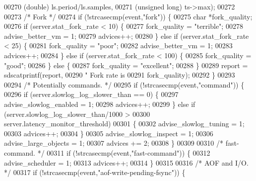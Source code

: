 \begin{DoxyCode}
{00270             (\textcolor{keywordtype}{double}) ls.period/ls.samples,
00271             (\textcolor{keywordtype}{unsigned} \textcolor{keywordtype}{long}) ts->max);
00272 
00273         \textcolor{comment}{/* Fork */}
00274         \textcolor{keywordflow}{if} (!strcasecmp(event,\textcolor{stringliteral}{"fork"})) \{
00275             \textcolor{keywordtype}{char} *fork\_quality;
00276             \textcolor{keywordflow}{if} (server.stat\_fork\_rate < 10) \{
00277                 fork\_quality = \textcolor{stringliteral}{"terrible"};
00278                 advise\_better\_vm = 1;
00279                 advices++;
00280             \} \textcolor{keywordflow}{else} \textcolor{keywordflow}{if} (server.stat\_fork\_rate < 25) \{
00281                 fork\_quality = \textcolor{stringliteral}{"poor"};
00282                 advise\_better\_vm = 1;
00283                 advices++;
00284             \} \textcolor{keywordflow}{else} \textcolor{keywordflow}{if} (server.stat\_fork\_rate < 100) \{
00285                 fork\_quality = \textcolor{stringliteral}{"good"};
00286             \} \textcolor{keywordflow}{else} \{
00287                 fork\_quality = \textcolor{stringliteral}{"excellent"};
00288             \}
00289             report = sdscatprintf(report,
00290                 \textcolor{stringliteral}{" Fork rate is %
00291                 fork\_quality);
00292         \}
00293 
00294         \textcolor{comment}{/* Potentially commands. */}
00295         \textcolor{keywordflow}{if} (!strcasecmp(event,\textcolor{stringliteral}{"command"})) \{
00296             \textcolor{keywordflow}{if} (server.slowlog\_log\_slower\_than == 0) \{
00297                 advise\_slowlog\_enabled = 1;
00298                 advices++;
00299             \} \textcolor{keywordflow}{else} \textcolor{keywordflow}{if} (server.slowlog\_log\_slower\_than/1000 >
00300                        server.latency\_monitor\_threshold)
00301             \{
00302                 advise\_slowlog\_tuning = 1;
00303                 advices++;
00304             \}
00305             advise\_slowlog\_inspect = 1;
00306             advise\_large\_objects = 1;
00307             advices += 2;
00308         \}
00309 
00310         \textcolor{comment}{/* fast-command. */}
00311         \textcolor{keywordflow}{if} (!strcasecmp(event,\textcolor{stringliteral}{"fast-command"})) \{
00312             advise\_scheduler = 1;
00313             advices++;
00314         \}
00315 
00316         \textcolor{comment}{/* AOF and I/O. */}
00317         \textcolor{keywordflow}{if} (!strcasecmp(event,\textcolor{stringliteral}{"aof-write-pending-fsync"})) \{
}}
\end{DoxyCode}
